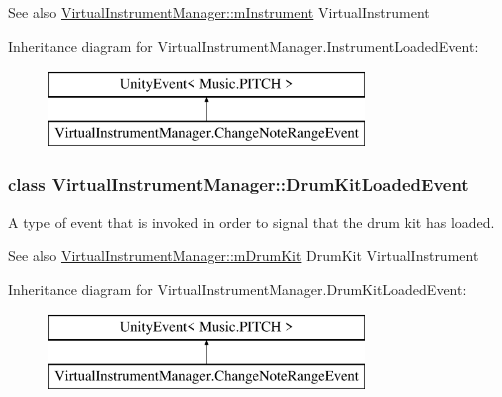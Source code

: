 \begin{DoxySeeAlso}{See also}
\hyperlink{group___virtual_instrument_manager_aed435d1f9be09864846db4322dc21fd1}{Virtual\+Instrument\+Manager\+::m\+Instrument} Virtual\+Instrument 
\end{DoxySeeAlso}
Inheritance diagram for Virtual\+Instrument\+Manager.\+Instrument\+Loaded\+Event\+:\begin{figure}[H]
\begin{center}
\leavevmode
\includegraphics[height=2.000000cm]{group___virtual_instrument_manager}
\end{center}
\end{figure}
\label{class_virtual_instrument_manager_1_1_drum_kit_loaded_event}
\subsubsection{class Virtual\+Instrument\+Manager\+:\+:Drum\+Kit\+Loaded\+Event}
A type of event that is invoked in order to signal that the drum kit has loaded. 

\begin{DoxySeeAlso}{See also}
\hyperlink{group___virtual_instrument_manager_a0bc7c9f776b0d2dae0ccb1f1ee5f2143}{Virtual\+Instrument\+Manager\+::m\+Drum\+Kit} Drum\+Kit Virtual\+Instrument 
\end{DoxySeeAlso}
Inheritance diagram for Virtual\+Instrument\+Manager.\+Drum\+Kit\+Loaded\+Event\+:\begin{figure}[H]
\begin{center}
\leavevmode
\includegraphics[height=2.000000cm]{group___virtual_instrument_manager}
\end{center}
\end{figure}
\label{class_virtual_instrument_manager_1_1_change_instrument_event}
